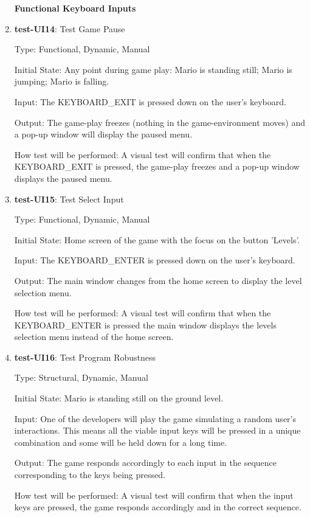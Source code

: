 \documentclass[12pt, titlepage]{article}
\begin{document}
\begin{enumerate}
\textbf{Functional Keyboard Inputs}

\item{\textbf{test-UI14}: Test Game Pause\\}

Type: Functional, Dynamic, Manual
					
Initial State: Any point during game play: Mario is standing still; Mario is jumping; Mario is falling.
					
Input: The KEYBOARD\_EXIT is pressed down on the user's keyboard.
					
Output: The game-play freezes (nothing in the game-environment moves) and a pop-up window will display the paused menu.
					
How test will be performed: A visual test will confirm that when the KEYBOARD\_EXIT is pressed, the game-play freezes and a pop-up window displays the paused menu.

\item{\textbf{test-UI15}: Test Select Input\\}

Type: Functional, Dynamic, Manual
					
Initial State: Home screen of the game with the focus on the button 'Levels'.
					
Input: The KEYBOARD\_ENTER is pressed down on the user's keyboard.
					
Output: The main window changes from the home screen to display the level selection menu.
					
How test will be performed: A visual test will confirm that when the KEYBOARD\_ENTER is pressed the main window displays the levels selection menu instead of the home screen.

\item{\textbf{test-UI16}: Test Program Robustness\\}

Type: Structural, Dynamic, Manual
					
Initial State: Mario is standing still on the ground level.
					
Input: One of the developers will play the game simulating a random user's interactions. This means all the viable input keys will be pressed in a unique combination and some will be held down for a long time.
					
Output: The game responds accordingly to each input in the sequence corresponding to the keys being pressed. 
					
How test will be performed: A visual test will confirm that when the input keys are pressed, the game responds accordingly and in the correct sequence.


\end{enumerate}
\end{document}
